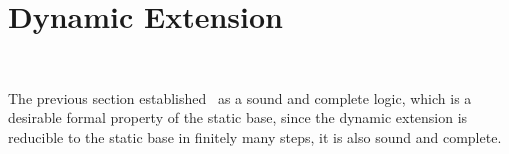 


\section{Dynamic Extension}~\label{sec:dynamic_ext}

The previous section established \DASL\ as a sound and complete logic, which is a desirable formal property of the static base, since the dynamic extension is reducible to the static base in finitely many steps, it is also sound and complete.

